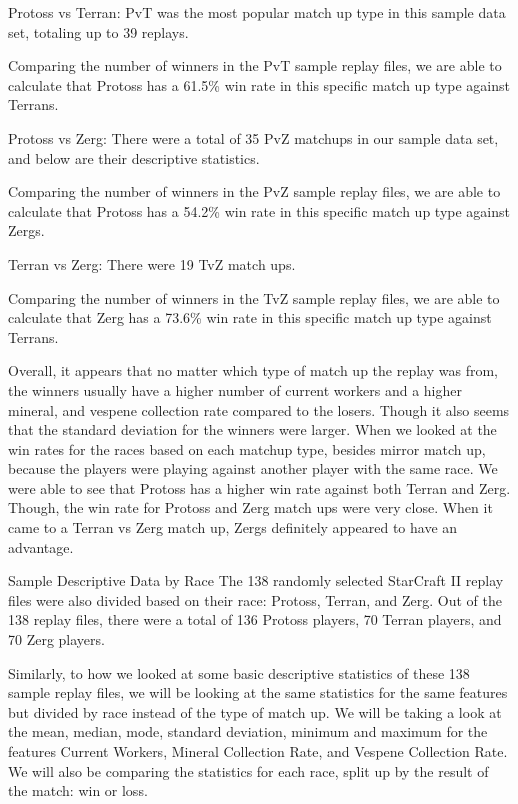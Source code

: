 \documentclass[a4paper,12pt]{report}
\begin{document}
Protoss vs Terran:
PvT was the most popular match up type in this sample data set, totaling up to 39 replays.

Comparing the number of winners in the PvT sample replay files, we are able to calculate that Protoss has a 61.5\% win rate in this specific match up type against Terrans.

Protoss vs Zerg:
There were a total of 35 PvZ matchups in our sample data set, and below are their descriptive statistics. 

Comparing the number of winners in the PvZ sample replay files, we are able to calculate that Protoss has a 54.2\% win rate in this specific match up type against Zergs.


Terran vs Zerg:
There were 19 TvZ match ups.

Comparing the number of winners in the TvZ sample replay files, we are able to calculate that Zerg has a 73.6\% win rate in this specific match up type against Terrans.

Overall, it appears that no matter which type of match up the replay was from, the winners usually have a higher number of current workers and a higher mineral, and vespene collection rate compared to the losers. Though it also seems that the standard deviation for the winners were larger. When we looked at the win rates for the races based on each matchup type, besides mirror match up, because the players were playing against another player with the same race. We were able to see that Protoss has a higher win rate against both Terran and Zerg. Though, the win rate for Protoss and Zerg match ups were very close. When it came to a Terran vs Zerg match up, Zergs definitely appeared to have an advantage. 

Sample Descriptive Data by Race
The 138 randomly selected StarCraft II replay files were also divided based on their race: Protoss, Terran, and Zerg. Out of the 138 replay files, there were a total of 136 Protoss players, 70 Terran players, and 70 Zerg players. 

Similarly, to how we looked at some basic descriptive statistics of these 138 sample replay files, we will be looking at the same statistics for the same features but divided by race instead of the type of match up. We will be taking a look at the mean, median, mode, standard deviation, minimum and maximum for the features Current Workers, Mineral Collection Rate, and Vespene Collection Rate. We will also be comparing the statistics for each race, split up by the result of the match: win or loss. 
\end{document}
